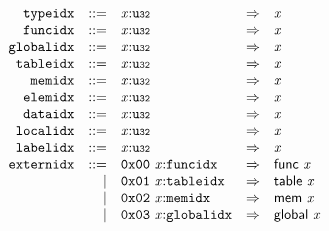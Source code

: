 $$
\begin{array}{@{}l@{}rrlll@{}l@{}}
& {\mathtt{typeidx}} &::=& {\mathit{x}}{:}{\mathtt{u{\scriptstyle32}}} &\Rightarrow& {\mathit{x}} \\
& {\mathtt{funcidx}} &::=& {\mathit{x}}{:}{\mathtt{u{\scriptstyle32}}} &\Rightarrow& {\mathit{x}} \\
& {\mathtt{globalidx}} &::=& {\mathit{x}}{:}{\mathtt{u{\scriptstyle32}}} &\Rightarrow& {\mathit{x}} \\
& {\mathtt{tableidx}} &::=& {\mathit{x}}{:}{\mathtt{u{\scriptstyle32}}} &\Rightarrow& {\mathit{x}} \\
& {\mathtt{memidx}} &::=& {\mathit{x}}{:}{\mathtt{u{\scriptstyle32}}} &\Rightarrow& {\mathit{x}} \\
& {\mathtt{elemidx}} &::=& {\mathit{x}}{:}{\mathtt{u{\scriptstyle32}}} &\Rightarrow& {\mathit{x}} \\
& {\mathtt{dataidx}} &::=& {\mathit{x}}{:}{\mathtt{u{\scriptstyle32}}} &\Rightarrow& {\mathit{x}} \\
& {\mathtt{localidx}} &::=& {\mathit{x}}{:}{\mathtt{u{\scriptstyle32}}} &\Rightarrow& {\mathit{x}} \\
& {\mathtt{labelidx}} &::=& {\mathit{x}}{:}{\mathtt{u{\scriptstyle32}}} &\Rightarrow& {\mathit{x}} \\
& {\mathtt{externidx}} &::=& \mathtt{0x00}~{\mathit{x}}{:}{\mathtt{funcidx}} &\Rightarrow& \mathsf{func}~{\mathit{x}} \\ &&|&
\mathtt{0x01}~{\mathit{x}}{:}{\mathtt{tableidx}} &\Rightarrow& \mathsf{table}~{\mathit{x}} \\ &&|&
\mathtt{0x02}~{\mathit{x}}{:}{\mathtt{memidx}} &\Rightarrow& \mathsf{mem}~{\mathit{x}} \\ &&|&
\mathtt{0x03}~{\mathit{x}}{:}{\mathtt{globalidx}} &\Rightarrow& \mathsf{global}~{\mathit{x}} \\
\end{array}
$$

\vspace{1ex}

\vspace{1ex}

